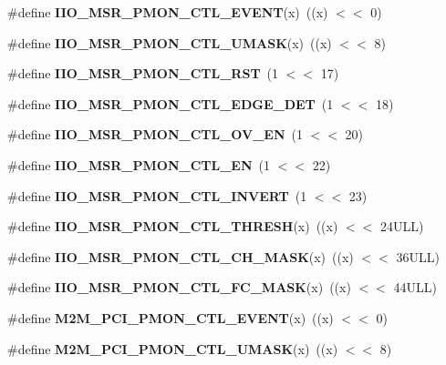 \begin{DoxyCompactItemize}
\item 
\mbox{\label{types_8h_a9b20c98b8358a0f949b411e9cfd21a2e}} 
\#define {\bfseries I\+I\+O\+\_\+\+M\+S\+R\+\_\+\+P\+M\+O\+N\+\_\+\+C\+T\+L\+\_\+\+E\+V\+E\+NT}(x)~((x) $<$$<$ 0)
\item 
\mbox{\label{types_8h_a676486f5be39ba840dafb5f52df20bc4}} 
\#define {\bfseries I\+I\+O\+\_\+\+M\+S\+R\+\_\+\+P\+M\+O\+N\+\_\+\+C\+T\+L\+\_\+\+U\+M\+A\+SK}(x)~((x) $<$$<$ 8)
\item 
\mbox{\label{types_8h_af476b4db0754cb2edf4e44e532ab9059}} 
\#define {\bfseries I\+I\+O\+\_\+\+M\+S\+R\+\_\+\+P\+M\+O\+N\+\_\+\+C\+T\+L\+\_\+\+R\+ST}~(1 $<$$<$ 17)
\item 
\mbox{\label{types_8h_a6163630ab238bc6935c7bdf239737e0f}} 
\#define {\bfseries I\+I\+O\+\_\+\+M\+S\+R\+\_\+\+P\+M\+O\+N\+\_\+\+C\+T\+L\+\_\+\+E\+D\+G\+E\+\_\+\+D\+ET}~(1 $<$$<$ 18)
\item 
\mbox{\label{types_8h_a9375d344e43c335d41cce89c27f9d18f}} 
\#define {\bfseries I\+I\+O\+\_\+\+M\+S\+R\+\_\+\+P\+M\+O\+N\+\_\+\+C\+T\+L\+\_\+\+O\+V\+\_\+\+EN}~(1 $<$$<$ 20)
\item 
\mbox{\label{types_8h_a953fd2aa4f4fe0954603453ce94c14fe}} 
\#define {\bfseries I\+I\+O\+\_\+\+M\+S\+R\+\_\+\+P\+M\+O\+N\+\_\+\+C\+T\+L\+\_\+\+EN}~(1 $<$$<$ 22)
\item 
\mbox{\label{types_8h_ae1e6d595d5112491ae7aef933d79e6c8}} 
\#define {\bfseries I\+I\+O\+\_\+\+M\+S\+R\+\_\+\+P\+M\+O\+N\+\_\+\+C\+T\+L\+\_\+\+I\+N\+V\+E\+RT}~(1 $<$$<$ 23)
\item 
\mbox{\label{types_8h_a7835a75dd36f1e8a5be632ee68b0fa6c}} 
\#define {\bfseries I\+I\+O\+\_\+\+M\+S\+R\+\_\+\+P\+M\+O\+N\+\_\+\+C\+T\+L\+\_\+\+T\+H\+R\+E\+SH}(x)~((x) $<$$<$ 24\+U\+L\+L)
\item 
\mbox{\label{types_8h_a6faf2d8e80edf962bde1f524efa14d4a}} 
\#define {\bfseries I\+I\+O\+\_\+\+M\+S\+R\+\_\+\+P\+M\+O\+N\+\_\+\+C\+T\+L\+\_\+\+C\+H\+\_\+\+M\+A\+SK}(x)~((x) $<$$<$ 36\+U\+L\+L)
\item 
\mbox{\label{types_8h_a3c432f838a838188d1ca7fcc9bdc007a}} 
\#define {\bfseries I\+I\+O\+\_\+\+M\+S\+R\+\_\+\+P\+M\+O\+N\+\_\+\+C\+T\+L\+\_\+\+F\+C\+\_\+\+M\+A\+SK}(x)~((x) $<$$<$ 44\+U\+L\+L)
\item 
\mbox{\label{types_8h_aac3149a6c1df4900ca50511c2f83a38c}} 
\#define {\bfseries M2\+M\+\_\+\+P\+C\+I\+\_\+\+P\+M\+O\+N\+\_\+\+C\+T\+L\+\_\+\+E\+V\+E\+NT}(x)~((x) $<$$<$ 0)
\item 
\mbox{\label{types_8h_ab60cc2ef123701db90d8d3d03b7f6dde}} 
\#define {\bfseries M2\+M\+\_\+\+P\+C\+I\+\_\+\+P\+M\+O\+N\+\_\+\+C\+T\+L\+\_\+\+U\+M\+A\+SK}(x)~((x) $<$$<$ 8)

\end{DoxyCompactItemize}

